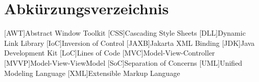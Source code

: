 \chapter*{Abkürzungsverzeichnis}
\label{abkürzungsverzeichnis}

\begin{acronym}
	[AWT]{Abstract Window Toolkit}
	[CSS]{Cascading Style Sheets}
	[DLL]{Dynamic Link Library}
	[IoC]{Inversion of Control}
	[JAXB]{Jakarta XML Binding}
	[JDK]{Java Development Kit}
	[LoC]{Lines of Code}
	[MVC]{Model-View-Controller}
	[MVVP]{Model-View-ViewModel}
	[SoC]{Separation of Concerns}
	[UML]{Unified Modeling Language}
	[XML]{Extensible Markup Language}
\end{acronym}

